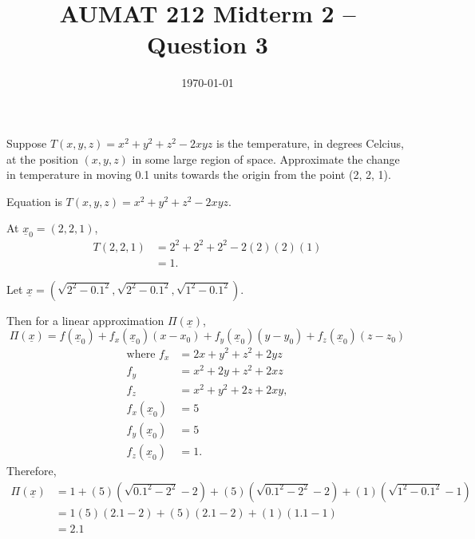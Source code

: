 \documentclass[12pt,a4paper]{article}
\title{AUMAT 212 Midterm 2 -- Question 3}
\date{\today}
\begin{document}
    \begin{problem}
        Suppose \(T(x,y,z) = x^2 + y^2 + z^2 - 2xyz\) is the temperature, in degrees Celcius, at the position \((x,y,z)\) in some large region of space. Approximate the change in temperature in moving 0.1 units towards the origin from the point (2, 2, 1).
    \end{problem}
    \begin{answer}
        Equation is \(T(x,y,z) = x^2 + y^2 + z^2 - 2xyz\).

        At \(\underline{x}_0 = (2,2,1)\),
        \begin{align*}
            T(2,2,1) &= 2^2 + 2^2 + 2^2 -2(2)(2)(1) \\
            &= 1.
        \end{align*}
        
        Let \(\underline{x} = (\sqrt{2^2 - 0.1^2}, \sqrt{2^2 - 0.1^2}, \sqrt{1^2 - 0.1^2})\).

        Then for a linear approximation \(\Pi(\underline{x})\), 
        \begin{equation*}
            \Pi(\underline{x}) = f(\underline{x}_0) + f_x({\underline{x}_0})(x - x_0) + f_y({\underline{x}_0})(y - y_0) + f_z({\underline{x}_0})(z - z_0)
        \end{equation*}
        \begin{align*}
            \text{where } f_x &= 2x + y^2 + z^2 + 2yz \\
            f_y &= x^2 + 2y + z^2 + 2xz \\
            f_z &= x^2 + y^2 + 2z + 2xy, \\
            f_x({\underline{x}_0}) &= 5 \\
            f_y({\underline{x}_0}) &= 5 \\
            f_z({\underline{x}_0}) &= 1.
        \end{align*}
        Therefore,
        \begin{align*}
            \Pi(\underline{x}) &= 1 + (5)(\sqrt{0.1^2 - 2^2} - 2) + (5)(\sqrt{0.1^2 - 2^2} - 2) + (1)(\sqrt{1^2 - 0.1^2} - 1) \\
            &= 1 (5)(2.1 - 2) + (5)(2.1 - 2) + (1)(1.1 - 1) \\
            &= 2.1
        \end{align*}
    \end{answer}
\end{document}
